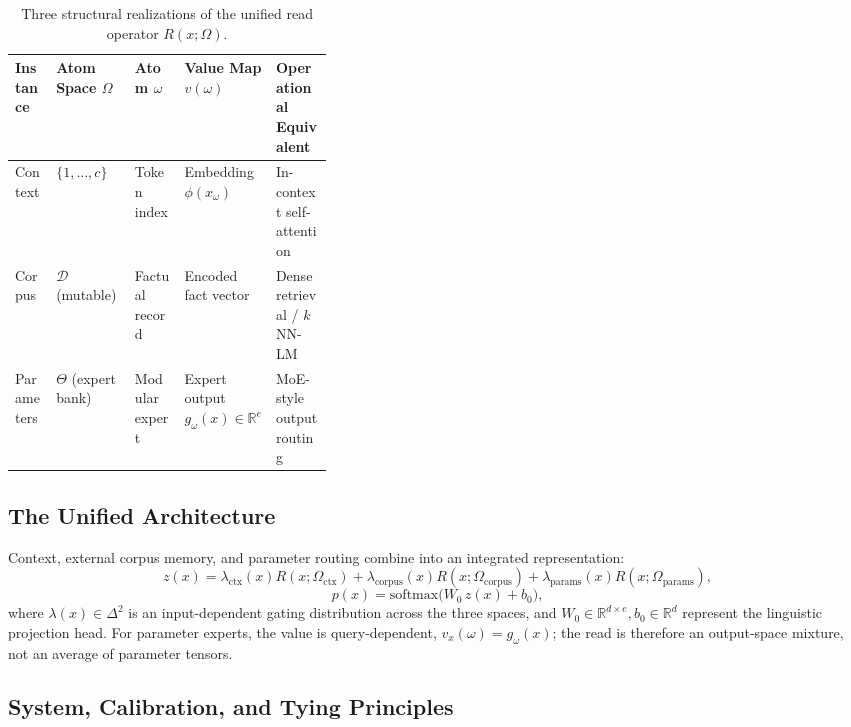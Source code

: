 \documentclass[preprint,12pt]{elsarticle}
\newcommand{\R}{\mathbb{R}}
\newcommand{\Om}{\Omega}
\begin{document}
\begin{table}[t]
\centering
\caption{Three structural realizations of the unified read operator $R(x; \Omega)$.}
\label{tab:instances}
\vspace{0.5em}
\footnotesize
\begin{tabular}{@{}lllL{0.185\linewidth}L{0.185\linewidth}@{}}
\toprule
Instance & Atom Space $\Om$ & Atom $\omega$ & Value Map $v(\omega)$ & Operational Equivalent \\
\midrule
Context & $\{1,\dots,c\}$ & Token index & Embedding $\phi(x_\omega)$ & In-context self-attention \cite{vaswani2017attention} \\
Corpus & $\mathcal{D}$ (mutable) & Factual record & Encoded fact vector & Dense retrieval / $k$NN-LM \cite{khandelwal2020generalization} \\
Parameters & $\Theta$ (expert bank) & Modular expert & Expert output $g_\omega(x)\in\R^e$ & MoE-style output routing \cite{shazeer2017outrageously, hu2021lora} \\
\bottomrule
\end{tabular}
\end{table}

\subsection{The Unified Architecture}

Context, external corpus memory, and parameter routing combine into an integrated representation:
\[
  z(x) = \lambda_{\mathrm{ctx}}(x) R(x; \Om_{\mathrm{ctx}}) 
       + \lambda_{\mathrm{corpus}}(x) R(x; \Om_{\mathrm{corpus}}) 
       + \lambda_{\mathrm{params}}(x) R(x; \Om_{\mathrm{params}}),
\]
\[
  p(x) = \mathrm{softmax}\big( W_0\, z(x) + b_0 \big),
\]
where $\lambda(x) \in \Delta^2$ is an input-dependent gating distribution across the three spaces, and $W_0 \in \R^{d \times e}, b_0 \in \R^d$ represent the linguistic projection head. For parameter experts, the value is query-dependent, $v_x(\omega)=g_\omega(x)$; the read is therefore an output-space mixture, not an average of parameter tensors.

\subsection{System, Calibration, and Tying Principles}
\label{sec:calibration}
\end{document}
